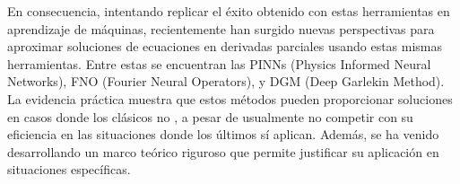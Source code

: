 En consecuencia, intentando replicar el éxito obtenido con estas herramientas en aprendizaje de máquinas, recientemente han surgido nuevas perspectivas para aproximar soluciones de ecuaciones en derivadas parciales usando estas mismas herramientas. Entre estas se encuentran las PINNs (Physics Informed Neural Networks)\cite{PINNs,PINNS2}, FNO (Fourier Neural Operators)\cite{li_fourier_2021}, y DGM (Deep Garlekin Method)\cite{sirignano_dgm_2018}. La evidencia práctica muestra que estos métodos pueden proporcionar soluciones en casos donde los clásicos no \cite{cuomo_scientific_2022,blechschmidt_three_2021}, a pesar de usualmente no competir con su eficiencia en las situaciones donde los últimos sí aplican. Además, se ha venido desarrollando un marco teórico riguroso que permite justificar su aplicación en situaciones específicas.  \\